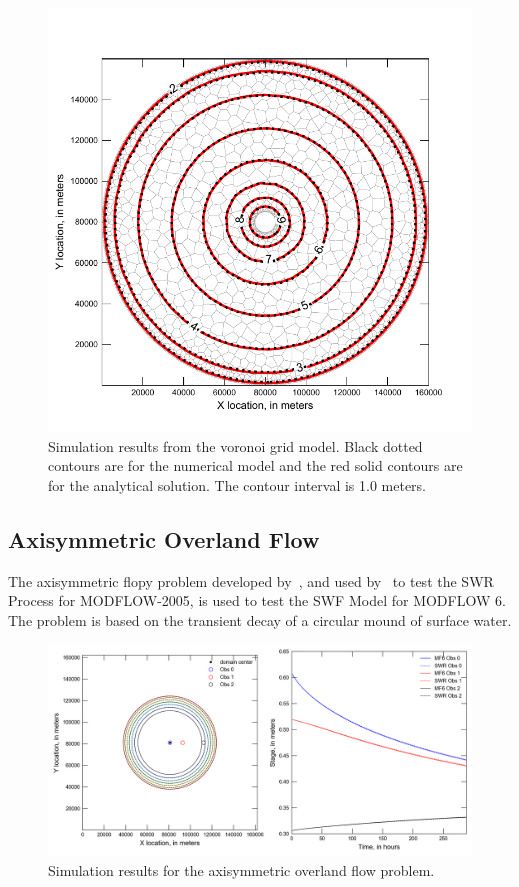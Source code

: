 \documentclass[fleqn]{article}
\begin{document}
\begin{figure}[h!tbp]
	\centering
	\includegraphics[scale=0.9]{figures/oned-voronoi-results.pdf}
	\caption[Simulation results from the voronoi grid model.]{Simulation results from the voronoi grid model.  Black dotted contours are for the numerical model and the red solid contours are for the analytical solution.  The contour interval is 1.0 meters.}
	\label{fig:oned-voronoi-results}
\end{figure}

\newpage
\subsection{Axisymmetric Overland Flow}

The axisymmetric flopy problem developed by~\cite{lal2001}, and used by~\cite{hughes2015} to test the SWR Process for MODFLOW-2005, is used to test the SWF Model for MODFLOW 6.  The problem is based on the transient decay of a circular mound of surface water.

\begin{figure}[h!tbp]
	\centering
	\includegraphics[scale=0.70]{figures/axi-results.png}
	\caption[Simulation results for the axisymmetric overland flow problem.]{Simulation results for the axisymmetric overland flow problem.}
	\label{fig:axi-results}
\end{figure}
\end{document}
